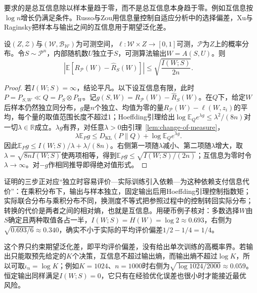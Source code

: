 要求的是总互信息除以样本量趋于零，而不是总互信息本身趋于零。例如互信息按$\log n$增长仍满足条件。Russo与Zou用信息量控制自适应分析中的选择偏差，Xu与Raginsky把样本与输出之间的互信息用于期望泛化差。

\begin{theorem}[互信息与期望风险]
\label{thm:mutual-information-risk}
设$(Z,\mathcal Z)$与$(\mathcal W,\mathcal B_{\mathcal W})$为可测空间，$\ell:\mathcal W\times Z\to[0,1]$可测，$\mathcal P$为$Z$上的概率分布。令$S\sim\mathcal P^n$，内部随机数$U$独立于$S$，可测算法输出$W=A(S,U)$。则
\begin{equation}
 \left|\mathbb E[R_{\mathcal P}(W)-\hat R_S(W)]\right|\leq\sqrt{\frac{I(W;S)}{2n}}.
 \label{eq:mutual-information-generalization}
\end{equation}
\end{theorem}
\begin{proof}
若$I(W;S)=\infty$，结论平凡。以下设互信息有限，此时$P=P_{S,W}\ll Q=P_S\otimes P_W$。记$g(S,W)=R_{\mathcal P}(W)-\hat R_S(W)$。在$Q$下，给定$W$后样本仍然独立同分布，$g$是$n$个独立、均值为零的量$R_{\mathcal P}(W)-\ell(W,z_i)$的平均，每个量的取值范围长度不超过1；Hoeffding引理给出$\log\mathbb E_Qe^{\lambda g}\leq\lambda^2/(8n)$对一切$\lambda\in\mathbb R$成立。$\lambda g$有界，对任意$\lambda>0$由引理~\ref{lem:change-of-measure}，
\begin{equation}
 \lambda\mathbb E_Pg\leq D_{\mathrm{KL}}(P\|Q)+\log\mathbb E_Qe^{\lambda g}.
 \label{eq:information-change-measure}
\end{equation}
因此$\mathbb E_Pg\leq I(W;S)/\lambda+\lambda/(8n)$。右侧第一项随$\lambda$减小、第二项随$\lambda$增大，取$\lambda=\sqrt{8nI(W;S)}$使两项相等，得到$\mathbb E_Pg\leq\sqrt{I(W;S)/(2n)}$；互信息为零时令$\lambda\to\infty$。对$-g$作相同推导即得绝对值形式。
\end{proof}

证明的三步正对应“独立时容易评价—实际训练引入依赖—为这种依赖支付信息代价”：在乘积分布下，输出与样本独立，固定输出后用Hoeffding引理控制指数矩；实际联合分布与乘积分布不同，换测度不等式把参照过程中的控制转回实际分布；转换的代价是两者之间的相对熵，也就是互信息。用硬币例子核对：多数选择$W$由$S$确定且两种取值各占一半，$I(W;S)=H(W)=\log2\approx0.693$，右侧为$\sqrt{0.693/6}\approx0.340$，确实不小于实际的平均评价偏差$1/2-1/4=1/4$。

这个界只约束期望泛化差，即平均评价偏差，没有给出单次训练的高概率界。若输出只能取预先给定的$K$个决策，互信息不超过输出熵，而输出熵不超过$\log K$，所以可取$\iota_n=\log K$；例如$K=1024$、$n=1000$时右侧为$\sqrt{\log1024/2000}\approx0.059$。恒定输出同样满足$I(W;S)=0$，它只有在经验优化误差也很小时才能接近最优风险。

